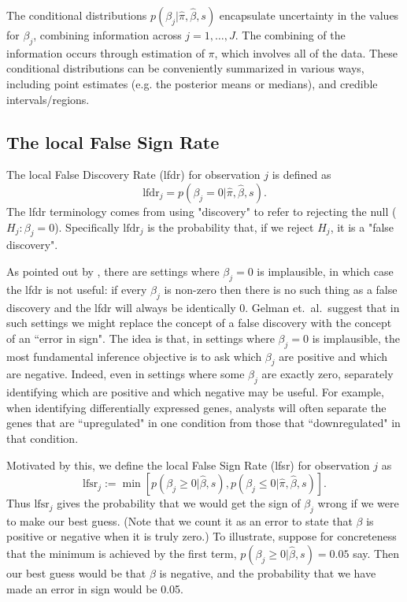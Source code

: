 \documentclass[11pt]{article}
\def\lfdr{\text{lfdr}}
\def\lfsr{\text{lfsr}}
\def\bhat{\hat{\beta}}
\begin{document}

The conditional distributions $p(\beta_j | \hat\pi, \bhat, s)$ 
encapsulate uncertainty in the values for $\beta_j$, combining information across
$j=1,\dots,J$. The combining of the information occurs through estimation of
$\pi$, which involves all of the data.
These conditional distributions can be conveniently summarized
in various ways, including point estimates (e.g. the posterior means or medians),
and credible intervals/regions.



\subsection*{The local False Sign Rate}

The local False Discovery Rate (lfdr) for observation $j$ is defined \cite{efron2001empirical} as
\begin{equation}
\lfdr_j = p(\beta_j = 0 | \hat\pi, \bhat, s).
\end{equation}
The lfdr terminology comes from using "discovery" to refer to rejecting the null ($H_j:\beta_j=0$).
Specifically $\lfdr_j$ is the probability that, if we reject $H_j$,
it is a  "false discovery".  



As pointed out by \cite{gelman2012we}, there are settings where
$\beta_j=0$ is implausible, in which case the lfdr is not useful: if every $\beta_j$ is non-zero then there
is no such thing as a false discovery and the lfdr will always be identically 0. 
Gelman et.~al.~suggest that in such settings we
might replace the concept of a false discovery with the
concept of an ``error in sign". The idea is that, in settings where $\beta_j=0$ is implausible, the most fundamental
inference objective is to ask which $\beta_j$ are positive and which are negative. Indeed, even in settings where some
$\beta_j$ are exactly zero, separately identifying which are positive and which negative may be useful. For example, when identifying differentially expressed genes,
analysts will often separate the genes that are ``upregulated" in one condition from those that ``downregulated" in that condition.

Motivated by this, we define the local False Sign Rate (lfsr) for observation $j$ as 
\begin{equation}
\lfsr_j := \min[ p(\beta_j \geq 0| \bhat, s), p(\beta_j \leq 0| \hat\pi, \bhat, s) ].
\end{equation}
Thus $\lfsr_j$ gives the probability that we would get the sign of $\beta_j$ wrong if we
were to make our best guess. (Note that we count it as an error to state that $\beta$ is positive or negative when it is truly zero.)
To illustrate, suppose for concreteness
that the minimum is achieved by the first term, $p(\beta_j \geq 0| \bhat, s)=0.05$ say. Then
our best guess would be that $\beta$ is negative, and the probability that we have
made an error in sign would be 0.05. 
\end{document}
